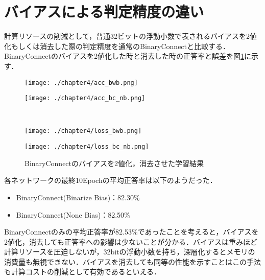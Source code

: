 \section{バイアスによる判定精度の違い}
計算リソースの削減として，普通32ビットの浮動小数で表されるバイアスを2値化もしくは消去した際の判定精度を通常のBinaryConnectと比較する．BinaryConnectのバイアスを2値化した時と消去した時の正答率と誤差を図\ref{fig_acc_loss_2}に示す．
\begin{figure}[!b]
  \begin{minipage}[b]{0.5\linewidth}
    \centering
    \texttt{[image: ./chapter4/acc\_bwb.png]}
  \end{minipage}
  \begin{minipage}[b]{0.5\linewidth}
    \centering
    \texttt{[image: ./chapter4/acc\_bc\_nb.png]}
  \end{minipage}\\
  \begin{minipage}[b]{0.5\linewidth}
    \centering
    \texttt{[image: ./chapter4/loss\_bwb.png]}
  \end{minipage}
  \begin{minipage}[b]{0.5\linewidth}
    \centering
    \texttt{[image: ./chapter4/loss\_bc\_nb.png]}
  \end{minipage}
  \caption{BinaryConnectのバイアスを2値化，消去させた学習結果}
  \label{fig_acc_loss_2}
\end{figure}

各ネットワークの最終10Epochの平均正答率は以下のようだった．
\begin{itemize}
  \item BinaryConnect(Binarize Bias)：82.30\%
  \item BinaryConnect(None Bias)：82.50\%
\end{itemize}
BinaryConnectのみの平均正答率が82.53\%であったことを考えると，バイアスを2値化，消去しても正答率への影響は少ないことが分かる．バイアスは重みほど計算リソースを圧迫しないが，32bitの浮動小数を持ち，深層化するとメモリの消費量も無視できない．バイアスを消去しても同等の性能を示すことはこの手法も計算コストの削減として有効であるといえる．
